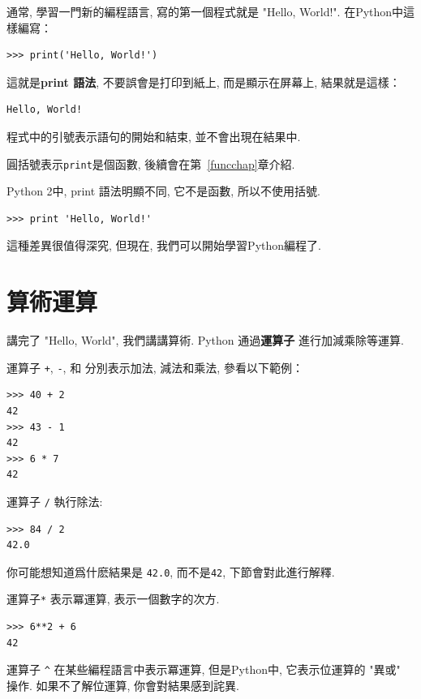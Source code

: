 \documentclass[10pt]{book}
\begin{document}
通常, 學習一門新的編程語言, 寫的第一個程式就是 "Hello, World!". 
在Python中這樣編寫：

\begin{verbatim}
>>> print('Hello, World!')
\end{verbatim}
%

這就是{\bf print 語法}, 不要誤會是打印到紙上, 而是顯示在屏幕上, 
結果就是這樣：

\begin{verbatim}
Hello, World!
\end{verbatim}
%

程式中的引號表示語句的開始和結束, 並不會出現在結果中. 

圓括號表示{\tt print}是個函數, 後續會在第~\ref{funcchap}章介紹. 
 

Python 2中, print 語法明顯不同, 它不是函數, 所以不使用括號. 

\begin{verbatim}
>>> print 'Hello, World!'
\end{verbatim}
%
這種差異很值得深究, 
但現在, 我們可以開始學習Python編程了. 


\section{算術運算}

講完了 "Hello, World", 我們講講算術. Python 通過{\bf 運算子} 
進行加減乘除等運算. 

運算子 {\tt +}, {\tt -}, 和 {\tt *} 分別表示加法, 減法和乘法, 參看以下範例：

\begin{verbatim}
>>> 40 + 2
42
>>> 43 - 1
42
>>> 6 * 7
42
\end{verbatim}
%
運算子 {\tt /} 執行除法:

\begin{verbatim}
>>> 84 / 2
42.0
\end{verbatim}
%

你可能想知道爲什麽結果是 {\tt 42.0}, 而不是{\tt 42}, 下節會對此進行解釋. 

運算子{\tt **} 表示冪運算, 表示一個數字的次方. 

\begin{verbatim}
>>> 6**2 + 6
42
\end{verbatim}
%

運算子 \verb"^" 在某些編程語言中表示冪運算, 但是Python中, 
它表示位運算的 "異或" 操作. 如果不了解位運算, 你會對結果感到詫異. 
\end{document}
